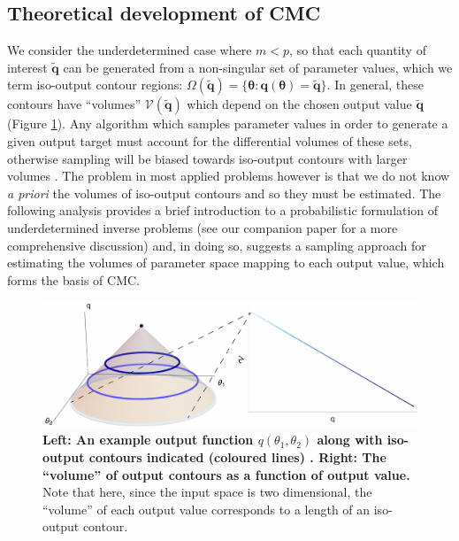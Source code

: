 \subsection{Theoretical development of CMC}
We consider the underdetermined case where $m<p$, so that each quantity of interest $\tilde{\boldsymbol{q}}$ can be generated from a non-singular set of parameter values, which we term iso-output contour regions: $\Omega(\tilde{\boldsymbol{q}}) = \{\boldsymbol{\theta}: \boldsymbol{q}(\boldsymbol{\theta}) = \tilde{\boldsymbol{q}}\}$. In general, these contours have ``volumes'' $\mathcal{V}(\tilde{\boldsymbol{q}})$ which depend on the chosen output value $\tilde{\boldsymbol{q}}$ (Figure \ref{fig:contour_volumes}). Any algorithm which samples parameter values in order to generate a given output target must account for the differential volumes of these sets, otherwise sampling will be biased towards iso-output contours with larger volumes \cite{lambert2018inverse}. The problem in most applied problems however is that we do not know \textit{a priori} the volumes of iso-output contours and so they must be estimated. The following analysis provides a brief introduction to a probabilistic formulation of underdetermined inverse problems (see our companion paper \cite{lambert2018inverse} for a more comprehensive discussion) and, in doing so, suggests a sampling approach for estimating the volumes of parameter space mapping to each output value, which forms the basis of CMC.

\begin{figure}[H]
	\centerline{\includegraphics[width=\textwidth]{../figures/contour_volumes_redux.pdf}}
	\caption{\textbf{Left: An example output function $q(\theta_1,\theta_2)$ along with iso-output contours indicated (coloured lines) . Right: The ``volume'' of output contours as a function of output value.} Note that here, since the input space is two dimensional, the ``volume'' of each output value corresponds to a length of an iso-output contour.}
	\label{fig:contour_volumes}
\end{figure}

